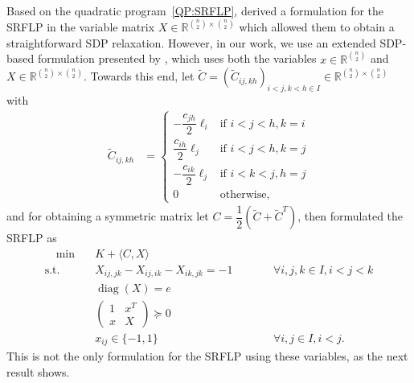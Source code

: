 \documentclass{article}
\newcommand{\dimension}{\binom{n}{2}}
\newcommand{\fourindex}{h}
\newcommand{\SRFLP}{SRFLP\xspace}
\DeclareMathOperator{\diag}{diag}
\begin{document}
Based on the quadratic program~\eqref{QP:SRFLP}, \citet{anjos_semidefinite_2005} derived a formulation for the \SRFLP in the variable matrix $X \in \mathbb R^{\binom{n}{2}\times\binom{n}{2}}$ which allowed them to obtain a straightforward SDP relaxation. However, in our work, we use an extended SDP-based formulation presented by \citet{hungerlander_semidefinite_2013}, which uses both the variables 
$x \in \mathbb R^{\binom{n}{2}}$ and $X \in \mathbb R^{\binom{n}{2}\times\binom{n}{2}}$.
Towards this end, let
$\widetilde C = (\widetilde C_{ij,kh})_{i<j,k<h \in I} \in \mathbb{R}^{\dimension \times \dimension}$ with
\begin{align}
    \widetilde C_{ij,kh} &= 
    \begin{cases}
        -\dfrac{c_{j\fourindex}}{2}\ell_i & \text{if } i < j < \fourindex, k=i \\[4pt]
        \dfrac{c_{i\fourindex}}{2}\ell_j & \text{if } i<j<\fourindex, k=j \\[4pt]
        -\dfrac{c_{ik}}{2}\ell_j & \text{if } i<k<j, \fourindex=j \\[4pt]
        0 & \text{otherwise}, 
    \end{cases}\label{eq:costMatrix}
\end{align}
and for obtaining a symmetric matrix let $C = \dfrac{1}{2}{(\widetilde C + \widetilde C^T)}$,
then \citet{hungerlander_semidefinite_2013} formulated the \SRFLP as
\begin{subequations}
\label{SRFLP}
\begin{align}
    \quad \min \quad & K + \langle C, X\rangle \label{eq:SRFLP-Obj}\\
    \text{s.t.} \quad & X_{ij,jk} - X_{ij,ik} - X_{ik,jk} = -1 &\qquad& \forall i, j
    , k \in I, i < j < k \label{eq:3Cycle}\\
    & \diag(X) = e \label{eq:SRFLP-diag}\\
    & \begin{pmatrix}
    1 & x^T \\
    x & X
\end{pmatrix}\succeq 0 \label{eq:SRFLP-psd}\\
    & x_{ij} \in \{-1,1\} && \forall i, j \in I, i < j. \label{eq:x_integer}
\end{align}
\end{subequations}
This is not the only formulation for the \SRFLP using these variables, as the next result shows.
\end{document}
